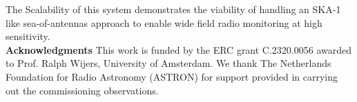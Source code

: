 \documentclass{ws-jai}
\begin{document}
The Scalability of  this system demonstrates the viability of  handling an SKA-1
like  sea-of-antennas approach  to enable  wide field  radio monitoring  at high
sensitivity.\\

\noindent \textbf{Acknowledgments}
This work is funded by the ERC grant C.2320.0056 awarded to Prof.  Ralph Wijers,
University  of Amsterdam. We  thank The  Netherlands  Foundation for  Radio
Astronomy  (ASTRON)  for support  provided  in  carrying out  the  commissioning
observations.



\end{document}
